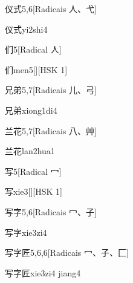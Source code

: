 \begin{entry}{仪式}{5,6}[Radicais ⼈、⼷]
  \begin{phonetics}{仪式}{yi2shi4}
  \end{phonetics}
\end{entry}

\begin{entry}{们}{5}[Radical ⼈]
  \begin{phonetics}{们}{men5}[][HSK 1]
  \end{phonetics}
\end{entry}

\begin{entry}{兄弟}{5,7}[Radicais ⼉、⼸]
  \begin{phonetics}{兄弟}{xiong1di4}
  \end{phonetics}
\end{entry}

\begin{entry}{兰花}{5,7}[Radicais ⼋、⾋]
  \begin{phonetics}{兰花}{lan2hua1}
  \end{phonetics}
\end{entry}

\begin{entry}{写}{5}[Radical ⼍]
  \begin{phonetics}{写}{xie3}[][HSK 1]
  \end{phonetics}
\end{entry}

\begin{entry}{写字}{5,6}[Radicais ⼍、⼦]
  \begin{phonetics}{写字}{xie3zi4}
  \end{phonetics}
\end{entry}

\begin{entry}{写字匠}{5,6,6}[Radicais ⼍、⼦、⼕]
  \begin{phonetics}{写字匠}{xie3zi4 jiang4}
  \end{phonetics}
\end{entry}

